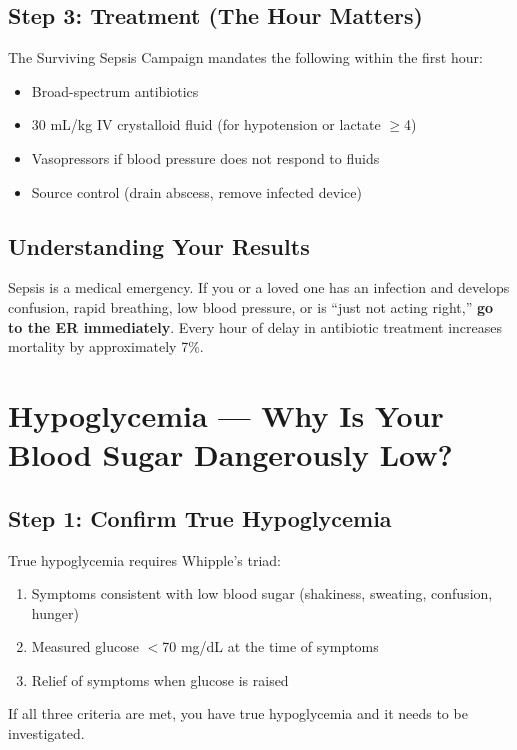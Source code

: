 \subsection{Step 3: Treatment (The Hour Matters)}

The Surviving Sepsis Campaign mandates the following within the first hour:
\begin{itemize}
    \item Broad-spectrum antibiotics
    \item 30 mL/kg IV crystalloid fluid (for hypotension or lactate $\geq$4)
    \item Vasopressors if blood pressure does not respond to fluids
    \item Source control (drain abscess, remove infected device)
\end{itemize}

\subsection{Understanding Your Results}

Sepsis is a medical emergency. If you or a loved one has an infection and develops confusion, rapid breathing, low blood pressure, or is ``just not acting right,'' \textbf{go to the ER immediately}. Every hour of delay in antibiotic treatment increases mortality by approximately 7\%.

\clearpage
\section{Hypoglycemia --- Why Is Your Blood Sugar Dangerously Low?}

\subsection{Step 1: Confirm True Hypoglycemia}

True hypoglycemia requires Whipple's triad:
\begin{enumerate}
    \item Symptoms consistent with low blood sugar (shakiness, sweating, confusion, hunger)
    \item Measured glucose $<$70 mg/dL at the time of symptoms
    \item Relief of symptoms when glucose is raised
\end{enumerate}

If all three criteria are met, you have true hypoglycemia and it needs to be investigated.

